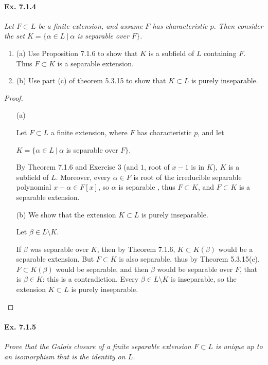 \documentclass[11pt,a4paper]{article}
\newcommand{\be} {\begin{enumerate}}
\newcommand{\ee} {\end{enumerate}}
\begin{document}
\paragraph{Ex. 7.1.4}

{\it Let $F \subset L$ be a finite extension, and assume $F$ has characteristic $p$. Then consider the set $K = \{\alpha \in L \ | \ \alpha$ {\rm is separable over} $F\}$.
\be
\item[(a)] Use Proposition 7.1.6 to show that $K$ is a subfield of $L$ containing $F$. Thus $F \subset K$ is a separable extension.
\item[(b)] Use part (c) of theorem 5.3.15 to show that $K \subset L$ is purely inseparable.
\ee
}

\begin{proof}
\begin{enumerate}
\item[(a)]

Let $F\subset L$ a finite extension, where $F$ has characteristic $p$, and let 
\begin{center}
$K = \{\alpha \in L \ \vert \ \alpha$ is separable over $F\}$.
\end{center}
By Theorem 7.1.6 and Exercise 3 (and $1$, root of $x-1$ is in $K$), $K$ is a subfield of $L$. Moreover, every $\alpha\in F$ is root of the irreducible separable polynomial $x-\alpha \in F[x]$,  so $\alpha$ is separable , thus $F\subset K$, and $F \subset K$ is a separable extension. 

\item[(b)] We show that the extension $K\subset L$ is purely inseparable.

Let $\beta \in L \setminus K$. 

If $\beta$ was separable over $K$, then by Theorem 7.1.6, $ K \subset K(\beta)$ would be a separable extension. But $F \subset K$ is also separable, thus by Theorem 5.3.15(c), $F \subset K(\beta)$ would be separable, and then $\beta$ would be separable over $F$, that is $\beta \in K$: this is a contradiction. Every $\beta \in L\setminus K$ is inseparable, so  the extension $K \subset L$ is purely inseparable.
\end{enumerate}
\end{proof}

\paragraph{Ex. 7.1.5}

{\it Prove that the Galois closure of a finite separable extension $F \subset L$ is unique up to an isomorphism that is the identity on $L$.
}
\end{document}
